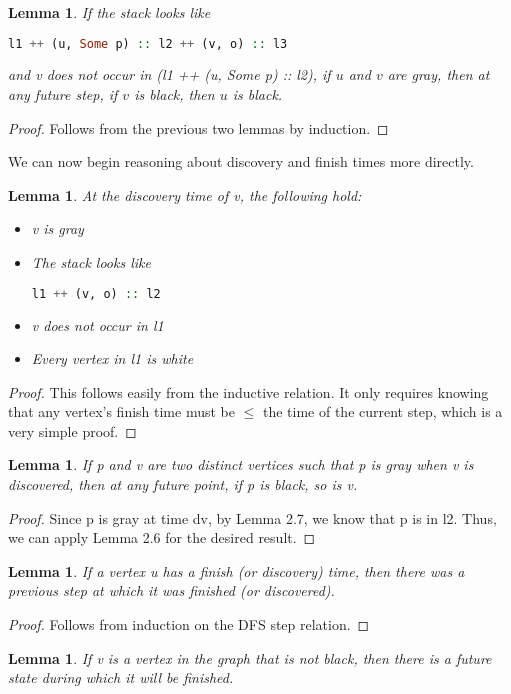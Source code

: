 \documentclass{article}
\newtheorem{lemma}[theorem]{Lemma}
\begin{document}
\begin{lemma}
If the stack looks like
\begin{lstlisting}[language=Haskell]
l1 ++ (u, Some p) :: l2 ++ (v, o) :: l3
\end{lstlisting}
and v does not occur in (l1 ++ (u, Some p) :: l2),
if $u$ and $v$ are gray, then at any future step, if $v$ is black, then $u$ is black.
\end{lemma}
\begin{proof}
Follows from the previous two lemmas by induction.
\end{proof}
We can now begin reasoning about discovery and finish times more directly.
\begin{lemma}
At the discovery time of v, the following hold:
\begin{itemize}
\item
v is gray
\item
The stack looks like 
\begin{lstlisting}[language=Haskell]
l1 ++ (v, o) :: l2
\end{lstlisting}
\item
v does not occur in l1
\item
Every vertex in l1 is white
\end{itemize}
\end{lemma}
\begin{proof}
This follows easily from the inductive relation. It only requires knowing that any vertex's finish time must be $\leq$ the time of the current step, which is a very simple proof.
\end{proof}
\begin{lemma}
If p and v are two distinct vertices such that p is gray when v is discovered, then at any future point, if p is black, so is v.
\end{lemma}
\begin{proof}
Since p is gray at time dv, by Lemma 2.7, we know that p is in l2. Thus, we can apply Lemma 2.6 for the desired result.
\end{proof}
\begin{lemma}
If a vertex u has a finish (or discovery) time, then there was a previous step at which it was finished (or discovered).
\end{lemma}
\begin{proof}
Follows from induction on the DFS step relation.
\end{proof}
\begin{lemma}
If v is a vertex in the graph that is not black, then there is a future state during which it will be finished.
\end{lemma}
\end{document}
